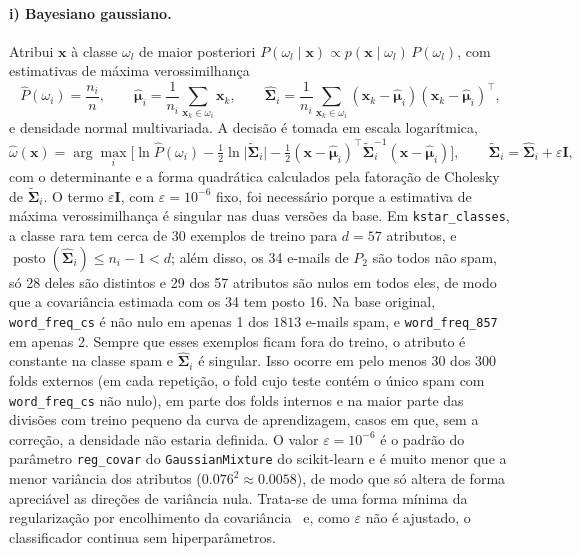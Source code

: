 \documentclass[11pt,a4paper]{article}
\begin{document}
\paragraph{i) Bayesiano gaussiano.} Atribui $\mathbf{x}$ à classe $\omega_l$ de maior posteriori
$P(\omega_l\mid\mathbf{x})\propto p(\mathbf{x}\mid\omega_l)\,P(\omega_l)$, com estimativas de máxima verossimilhança~\cite{duda2001pattern}
\begin{equation}
\hat P(\omega_i)=\frac{n_i}{n},\qquad
\hat{\bm\mu}_i=\frac{1}{n_i}\sum_{\mathbf{x}_k\in\omega_i}\mathbf{x}_k,\qquad
\hat{\bm\Sigma}_i=\frac{1}{n_i}\sum_{\mathbf{x}_k\in\omega_i}(\mathbf{x}_k-\hat{\bm\mu}_i)(\mathbf{x}_k-\hat{\bm\mu}_i)^\top ,
\end{equation}
e densidade normal multivariada. A decisão é tomada em escala logarítmica,
\begin{equation}
\hat\omega(\mathbf{x})=\arg\max_i\Big[\ln\hat P(\omega_i)-\tfrac12\ln\big|\tilde{\bm\Sigma}_i\big|
-\tfrac12(\mathbf{x}-\hat{\bm\mu}_i)^\top\tilde{\bm\Sigma}_i^{-1}(\mathbf{x}-\hat{\bm\mu}_i)\Big],
\qquad \tilde{\bm\Sigma}_i=\hat{\bm\Sigma}_i+\varepsilon\mathbf{I},
\end{equation}
com o determinante e a forma quadrática calculados pela fatoração de Cholesky de $\tilde{\bm\Sigma}_i$. O termo
$\varepsilon\mathbf{I}$, com $\varepsilon=10^{-6}$ fixo, foi necessário porque a estimativa de máxima
verossimilhança é singular nas duas versões da base. Em \texttt{kstar\_classes}, a classe rara tem cerca de 30
exemplos de treino para $d=57$ atributos, e $\operatorname{posto}(\hat{\bm\Sigma}_i)\le n_i-1<d$; além disso, os 34
e-mails de $P_2$ são todos não spam, só 28 deles são distintos e 29 dos 57 atributos são nulos em todos eles, de
modo que a covariância estimada com os 34 tem posto 16. Na base original, \texttt{word\_freq\_cs} é não nulo em
apenas 1 dos $\num{1813}$ e-mails spam, e \texttt{word\_freq\_857} em apenas 2. Sempre que esses exemplos ficam fora
do treino, o atributo é constante na classe spam e $\hat{\bm\Sigma}_i$ é singular. Isso ocorre em pelo menos 30 dos
300 folds externos (em cada repetição, o fold cujo teste contém o único spam com \texttt{word\_freq\_cs} não nulo),
em parte dos folds internos e na maior parte das divisões com treino pequeno da curva de aprendizagem, casos em
que, sem a correção, a densidade não estaria definida. O valor $\varepsilon=10^{-6}$ é o padrão do parâmetro
\texttt{reg\_covar} do \texttt{GaussianMixture} do scikit-learn e é muito menor que a menor variância dos
atributos ($\num{0.076}^2\approx\num{0.0058}$), de modo que só altera de forma apreciável as direções de variância
nula. Trata-se de uma forma mínima da regularização por encolhimento da
covariância~\cite{ledoit2004wellconditioned,hastie2009elements} e, como $\varepsilon$ não é ajustado, o
classificador continua sem hiperparâmetros.
\end{document}
